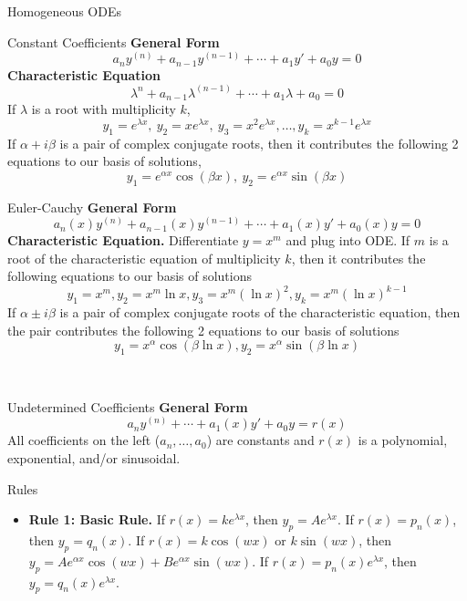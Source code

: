 \documentclass{article}
\begin{document}
\begin{multicols*}{3}
    \begin{blackbox}{Homogeneous ODEs}
        {\footnotesize
        \begin{bluebox}{Constant Coefficients}
            \textbf{General Form}\\[-2ex]
            \[a_ny^{(n)} + a_{n-1}y^{(n-1)} + \cdots + a_1y' + a_0y = 0\]
            \textbf{Characteristic Equation}
            \[\lambda^n + a_{n-1}\lambda^{(n-1)} + \cdots + a_1\lambda + a_0 = 0\]
            If $\lambda$ is a root with multiplicity $k$, 
            \[y_1 = e^{\lambda x}, \ y_2 = xe^{\lambda x}, \ y_3 = x^2e^{\lambda x}, \ldots, y_k = x^{k-1}e^{\lambda x}\]
            If $\alpha + i\beta$ is a pair of complex conjugate roots, then it contributes the following 2 equations to our basis of solutions,\\[-2ex]
            \[y_1 = e^{\alpha x}\cos(\beta x), \ y_2 = e^{\alpha x}\sin(\beta x)\]
        \end{bluebox}
        \begin{brownbox}{Euler-Cauchy}
            \textbf{General Form}\\[-2ex]
            \[a_n(x)y^{(n)} + a_{n-1}(x)y^{(n-1)} + \cdots + a_1(x)y' + a_0(x)y = 0\]
            \textbf{Characteristic Equation.} Differentiate $y = x^m$ and plug into ODE. If $m$ is a root of the characteristic equation of multiplicity $k$, then it contributes the following equations to our basis of solutions
            \[y_1 = x^m, y_2 = x^m\ln x, y_3 = x^m (\ln x)^2, y_k = x^m(\ln x)^{k-1}\]
            If $\alpha \pm i\beta$ is a pair of complex conjugate roots of the characteristic equation, then the pair contributes the following 2 equations to our basis of solutions
            \[y_1 = x^{\alpha} \cos(\beta \ln x), y_2 = x^\alpha\sin(\beta \ln x)\]
        \end{brownbox}\\[-2ex]
        }
    \end{blackbox}
    \begin{blackbox}{Undetermined Coefficients}
        \textbf{General Form}\\[-2ex]
        \[a_ny^{(n)} + \cdots + a_1(x)y' + a_0y = r(x)\]
        All coefficients on the left ($a_n, \ldots, a_0$) are constants and $r(x)$ is a polynomial, exponential, and/or sinusoidal.
        \begin{pinkbox}{Rules}
            \begin{itemize}[leftmargin=5pt]
                \item \textbf{Rule 1: Basic Rule.} If $r(x) = ke^{\lambda x}$, then $y_p = Ae^{\lambda x}$. If $r(x) = p_n(x)$, then $y_p = q_n(x)$. If $r(x) = k\cos(wx)$ or $k\sin(wx)$, then $y_p = Ae^{\alpha x}\cos(wx) + Be^{\alpha x}\sin(wx)$. If $r(x) = p_n(x)e^{\lambda x}$, then $y_p = q_n(x)e^{\lambda x}$.

\end{itemize}
\end{pinkbox}
\end{blackbox}
\end{multicols*}
\end{document}
